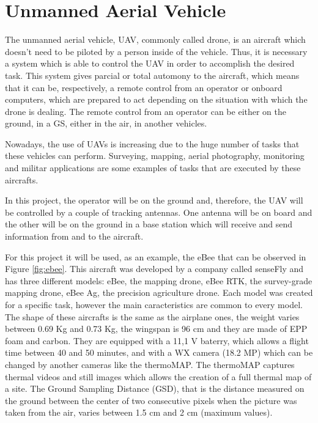 \section{Unmanned Aerial Vehicle}\label{sec:drone}

The unmanned aerial vehicle, UAV, commonly called drone, is an aircraft which doesn't need to be piloted by a person inside of the vehicle. Thus, it is necessary a system which is able to control the UAV in order to accomplish the desired task. This system gives parcial or total automony to the aircraft, which means that it can be, respectively, a remote control from an operator or onboard computers, which are prepared to act depending on the situation with which the drone is dealing. The remote control from an operator can be either on the ground, in a GS, either in the air, in another vehicles.

Nowadays, the use of UAVs is increasing due to the huge number of tasks that these vehicles can perform. Surveying, mapping, aerial photography, monitoring and militar applications are some examples of tasks that are executed by these aircrafts.  

In this project, the operator will be on the ground and, therefore, the UAV will be controlled by a couple of tracking antennas. One antenna will be on board and the other will be on the ground in a base station which will receive and send information from and to the aircraft. 

For this project it will be used, as an example, the eBee that can be observed in Figure \ref{fig:ebee}. This aircraft was developed by a company called senseFly and has three different models: eBee, the mapping drone, eBee RTK, the survey-grade mapping drone, eBee Ag, the precision agriculture drone. Each model was created for a specific task, however the main caracteristics are common to every model. The shape of these aircrafts is the same as the airplane ones, the weight varies between 0.69 Kg and 0.73 Kg, the wingspan is 96 cm and they are made of EPP foam and carbon. They are equipped with a 11,1 V baterry, which allows a flight time between 40 and 50 minutes, and with a WX camera (18.2 MP) which can be changed by another cameras like the thermoMAP. The thermoMAP captures thermal videos and still images which allows the creation of a full thermal map of a site. The Ground Sampling Distance (GSD), that is the distance measured on the ground between the center of two consecutive pixels when the picture was taken from the air, varies between 1.5 cm and 2 cm (maximum values). 
 
